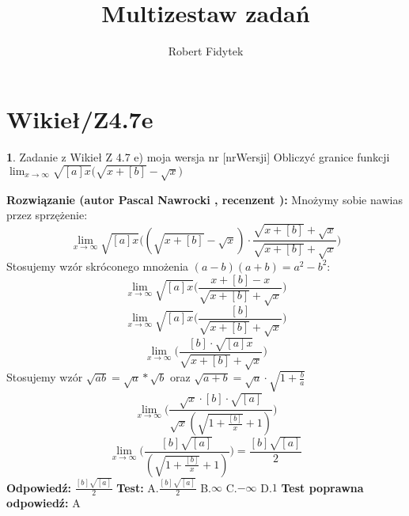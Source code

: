 \documentclass[12pt, a4paper]{article}
\title{Multizestaw zadań}
\author{Robert Fidytek}
\date{}
\theoremstyle{definition} %
\newtheorem{zad}{}
\newcommand{\kategoria}[1]{\section{#1}} %
\newcommand{\zadStart}[1]{\begin{zad}#1\newline} %
\newcommand{\zadStop}{\end{zad}}   %
\newcommand{\rozwStart}[2]{\noindent \textbf{Rozwiązanie (autor #1 , recenzent #2): }\newline} %
\newcommand{\rozwStop}{\newline}                                            %
\newcommand{\odpStart}{\noindent \textbf{Odpowiedź:}\newline}    %
\newcommand{\odpStop}{\newline}                                             %
\newcommand{\testStart}{\noindent \textbf{Test:}\newline} %
\newcommand{\testStop}{\newline} %
\newcommand{\kluczStart}{\noindent \textbf{Test poprawna odpowiedź:}\newline} %
\newcommand{\kluczStop}{\newline} %
\begin{document}
\maketitle


\kategoria{Wikieł/Z4.7e}
\zadStart{Zadanie z Wikieł Z 4.7 e) moja wersja nr [nrWersji]}
Obliczyć granice funkcji $\displaystyle{\lim_{x \to \infty}}\sqrt{[a]x}\big(\sqrt{x+[b]}-\sqrt{x}\big)$
\zadStop
\rozwStart{Pascal Nawrocki}{}
Mnożymy sobie nawias przez sprzężenie:
$$\displaystyle{\lim_{x \to \infty}}\sqrt{[a]x}\big((\sqrt{x+[b]}-\sqrt{x})\cdot\frac{\sqrt{x+[b]}+\sqrt{x}}{\sqrt{x+[b]}+\sqrt{x}}\big)$$
Stosujemy wzór skróconego mnożenia $(a-b)(a+b)=a^2-b^2$:
$$\displaystyle{\lim_{x \to \infty}}\sqrt{[a]x}\bigg(\frac{x+[b]-x}{\sqrt{x+[b]}+\sqrt{x}}\bigg)$$
$$\displaystyle{\lim_{x \to \infty}}\sqrt{[a]x}\bigg(\frac{[b]}{\sqrt{x+[b]}+\sqrt{x}}\bigg)$$
$$\displaystyle{\lim_{x \to \infty}}\bigg(\frac{[b]\cdot\sqrt{[a]x}}{\sqrt{x+[b]}+\sqrt{x}}\bigg)$$
Stosujemy wzór $\sqrt{ab}=\sqrt{a}*\sqrt{b}$ oraz $\sqrt{a+b}=\sqrt{a}\cdot\sqrt{1+\frac{b}{a}}$
$$\displaystyle{\lim_{x \to \infty}}\bigg(\frac{\sqrt{x}\cdot[b]\cdot\sqrt{[a]}}{\sqrt{x}(\sqrt{1+\frac{[b]}{x}}+1)}\bigg)$$
$$\displaystyle{\lim_{x \to \infty}}\bigg(\frac{[b]\sqrt{[a]}}{(\sqrt{1+\frac{[b]}{x}}+1)}\bigg)=\frac{[b]\sqrt{[a]}}{2}$$
\rozwStop
\odpStart
$\frac{[b]\sqrt{[a]}}{2}$
\odpStop
\testStart
A.$\frac{[b]\sqrt{[a]}}{2}$
B.$\infty$
C.$-\infty$
D.$1$
\testStop
\kluczStart
A
\kluczStop
\end{document}
